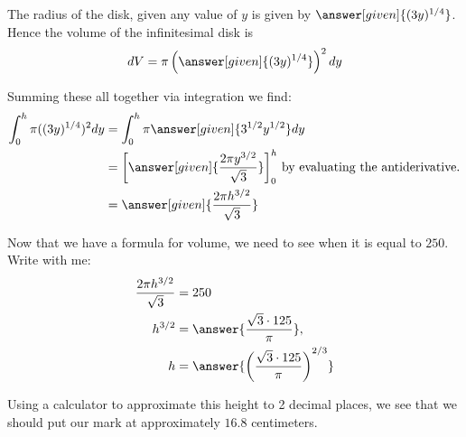 \documentclass{ximera}
\begin{document}
\begin{exercise}
\begin{image}
    \end{image}
    The radius of the disk, given any value of $y$ is given by
    $\answer[given]{(3y)^{1/4}}$. Hence the volume of the
    infinitesimal disk is
    \[
    dV = \pi \left(\answer[given]{(3y)^{1/4}}\right)^2 dy
    \]
   
   
   \begin{exercise}
   Summing these all together via integration we find:
    \begin{align*}
      \int_0^h \pi ((3y)^{1/4})^2 dy &= \int_0^h \pi\answer[given]{3^{1/2} y^{1/2}} dy\\
      &= \bigg[\answer[given]{\frac{2\pi y^{3/2}}{\sqrt{3}}}\bigg]_0^h \textrm{ by evaluating the antiderivative.} \\
      &= \answer[given]{\frac{2\pi h^{3/2}}{\sqrt{3}}} 
    \end{align*}
    
    \begin{exercise}
    
    Now that we have a formula for volume, we need to see when it is
    equal to $250$. Write with me:
    \begin{align*}
       \frac{2\pi h^{3/2}}{\sqrt{3}} &= 250\\
        h^{3/2} &=  \answer{\frac{\sqrt{3} \cdot 125}{\pi}},\\
      h &= \answer{\left(\frac{\sqrt{3} \cdot 125}{\pi}\right)^{2/3}}
    \end{align*}
    
    Using a calculator to approximate this height to 2 decimal places, we see that we should put our mark at approximately $16.8$ centimeters.

\end{exercise}
\end{exercise}
\end{exercise}
\end{document}
